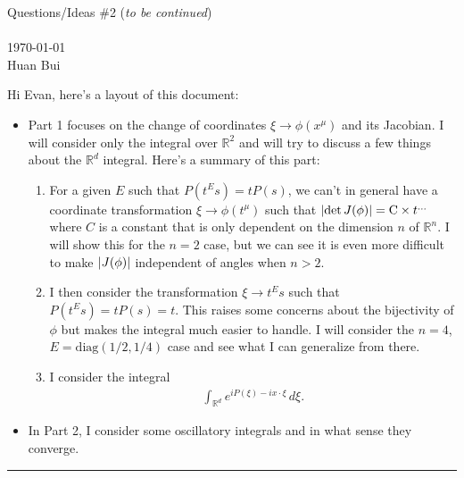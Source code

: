 \documentclass{article}
\theoremstyle{definition}
\begin{document}
\begin{center}
	\huge{Questions/Ideas \#2 (\textit{to be continued})}\\
	$\,$\\
	\normalsize{\today}\\
	\normalsize{Huan Bui}
\end{center}

Hi Evan, here's a layout of this document:
\begin{itemize}
	\item Part 1 focuses on the change of coordinates $\xi \to \phi(x^\mu)$ and its Jacobian. I will consider only the integral over $\mathbb{R}^2$ and will try to discuss a few things about the $\mathbb{R}^d$ integral. Here's a summary of this part: 
	\begin{enumerate}
		\item For a given $E$ such that $P(t^E s) = tP(s)$, we can't in general have a coordinate transformation $\xi \to \phi(t^\mu)$ such that $\abs{\det J(\phi)} = \text{C}\times t^{\dots}$ where $C$ is a constant that is only dependent on the dimension $n$ of $\mathbb{R}^n$. I will show this for the $n=2$ case, but we can see it is even more difficult to make $\abs{J(\phi)}$ independent of angles when $n>2$.  
		
		\item I then consider the transformation $\xi \to t^E s$ such that $P(t^E s) = tP(s) = t$. This raises some concerns about the bijectivity of $\phi$ but makes the integral much easier to handle. I will consider the $n=4$, $E = \text{diag}(1/2,1/4)$ case and see what I can generalize from there.
		
		\item I consider the integral 
		\begin{align}
		\int_{\mathbb{R}^d}e^{iP(\xi) - i x\cdot \xi}\,d\xi.
		\end{align}
	\end{enumerate}

	
	\item  In Part 2, I consider some oscillatory integrals and in what sense they converge.  
\end{itemize}
	
\hrule
\end{document}
